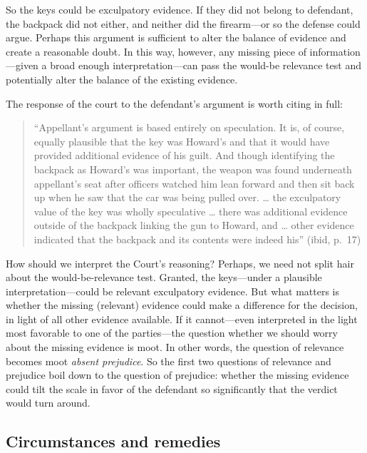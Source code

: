 \documentclass[
  10pt,
  dvipsnames,enabledeprecatedfontcommands]{scrartcl}
\begin{document}
\noindent So the keys could be exculpatory evidence. If they did not
belong to defendant, the backpack did not either, and neither did the
firearm---or so the defense could argue. Perhaps this argument is
sufficient to alter the balance of evidence and create a reasonable
doubt. In this way, however, any missing piece of information---given a
broad enough interpretation---can pass the would-be relevance test and
potentially alter the balance of the existing evidence.

The response of the court to the defendant's argument is worth citing in
full:

\begin{quote}
``Appellant's argument is based entirely on speculation. It is, of
course, equally plausible that the key was Howard's and that it would
have provided additional evidence of his guilt. And though identifying
the backpack as Howard's was important, the weapon was found underneath
appellant's seat after officers watched him lean forward and then sit
back up when he saw that the car was being pulled over. \ldots{} the
exculpatory value of the key was wholly speculative \ldots{} there was
additional evidence outside of the backpack linking the gun to Howard,
and \ldots{} other evidence indicated that the backpack and its contents
were indeed his'' (ibid, p.~17)
\end{quote}

\noindent How should we interpret the Court's reasoning? Perhaps, we
need not split hair about the would-be-relevance test. Granted, the
keys---under a plausible interpretation---could be relevant exculpatory
evidence. But what matters is whether the missing (relevant) evidence
could make a difference for the decision, in light of all other evidence
available. If it cannot---even interpreted in the light most favorable
to one of the parties---the question whether we should worry about the
missing evidence is moot. In other words, the question of relevance
becomes moot \emph{absent prejudice}. So the first two questions of
relevance and prejudice boil down to the question of prejudice: whether
the missing evidence could tilt the scale in favor of the defendant so
significantly that the verdict would turn around.

\hypertarget{circumstances-and-remedies}{%
\subsection{Circumstances and
remedies}\label{circumstances-and-remedies}}
\end{document}
